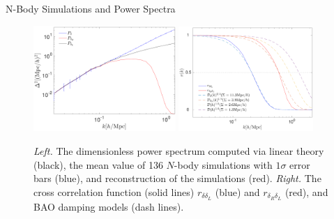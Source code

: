 \begin{section}{N-Body Simulations and Power Spectra}
  \begin{figure}
    \centering
    \includegraphics[width=0.48\textwidth]{fig2b.pdf}
    \includegraphics[width=0.455\textwidth]{fig2a.pdf}
    \caption{{\it Left.} The dimensionless power spectrum computed via
      linear theory (black), the mean value of 136 $N$-body
      simulations with $1\sigma$ error bars (blue), and reconstruction
      of the simulations (red).  {\it Right.} The cross correlation
      function (solid lines) $r_{\delta\delta_L}$ (blue) and
      $r_{\delta_R\delta_L}$ (red), and BAO damping models (dash
      lines).}
    \label{fig:cp}
  \end{figure}


\end{section}

